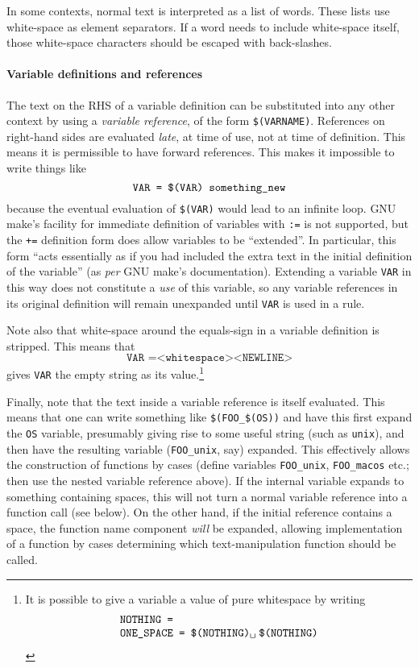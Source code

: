 In some contexts, normal text is interpreted as a list of words.
These lists use white-space as element separators.  If a word needs to
include white-space itself, those white-space characters should be
escaped with back-slashes.

\newcommand{\varref}[1]{\texttt{\$(#1)}}
\paragraph{Variable definitions and references} The text on the RHS of a variable
definition can be substituted into any other context by using a
\emph{variable reference}, of the form \varref{VARNAME}.
References on right-hand sides are evaluated \emph{late}, at time of use, not at time of definition.
This means it is permissible to have forward references.
This makes it impossible to write things like
\[
  \texttt{VAR = \varref{VAR} something\_new}
\]
because the eventual evaluation of \varref{VAR} would lead to an infinite loop.
GNU \textsf{make}'s facility for immediate definition of variables with \texttt{:=} is not supported, but the \texttt{+=} definition form does allow variables to be ``extended''.
In particular, this form ``acts essentially as if you had included the extra text in the initial definition of the variable'' (as \emph{per} GNU \textsf{make}'s documentation).
Extending a variable \texttt{VAR} in this way does not constitute a \emph{use} of this variable, so any variable references in its original definition will remain unexpanded until \texttt{VAR} is used in a rule.

Note also that white-space around the equals-sign in a variable
definition is stripped.  This means that
\[
\texttt{VAR =<whitespace><NEWLINE>}
\] gives \texttt{VAR} the empty string as its value.\footnote{It is
  possible to give a variable a value of pure whitespace by writing \[
\begin{array}{l}
\texttt{NOTHING =}\\
\texttt{ONE\_SPACE = \varref{NOTHING}\textvisiblespace\hspace{1mm}\varref{NOTHING}}\\
\end{array}\]}

Finally, note that the text inside a variable reference is itself
evaluated.  This means that one can write something like
\varref{FOO\_\varref{OS}} and have this first expand the \texttt{OS}
variable, presumably giving rise to some useful string (such as
\texttt{unix}), and then have the resulting variable
(\texttt{FOO\_unix}, say) expanded.  This effectively allows the
construction of functions by cases (define variables
\texttt{FOO\_unix}, \texttt{FOO\_macos} etc.; then use the nested
variable reference above).  If the internal variable expands to
something containing spaces, this will not turn a normal variable
reference into a function call (see below).  On the other hand,
if the initial reference contains a space, the function name component
\emph{will} be expanded, allowing implementation of a function by
cases determining which text-manipulation function should be called.

